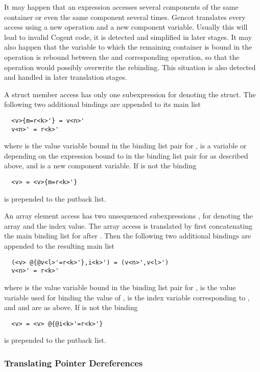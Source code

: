 It may happen that an expression accesses several components of the same container or even the same component several times.
Gencot translates every access using a new  operation and a new component variable. Usually this will lead to 
invalid Cogent code, it is detected and simplified in later stages. It may also happen that the variable to which the remaining 
container is bound in the  operation is rebound between the  and corresponding  operation,
so that the  operation would possibly overwrite the rebinding. This situation is also detected and handled in 
later translation stages.

A struct member access  has only one subexpression  for denoting the struct. The following two additional 
bindings are appended to its main list
\begin{verbatim}
  <v>{m=r<k>'} = v<n>'
  v<n>' = r<k>'
\end{verbatim}
where  is the value variable bound in the binding list pair for ,  is a variable or \code{\_} 
depending on the expression bound to  in the binding list pair for  as described above, and  
is a new component variable. If  is not \code{\_} the binding
\begin{verbatim}
  <v> = <v>{m=r<k>'}
\end{verbatim}
is prepended to the putback list.

An array element access  has two unsequenced subexpressions ,  for denoting the array and the index value.
The array access is translated by first concatenating the main binding list for  after . Then the following two additional 
bindings are appended to the resulting main list
\begin{verbatim}
  (<v> @{@v<l>'=r<k>'},i<k>') = (v<n>',v<l>')
  v<n>' = r<k>'
\end{verbatim}
where  is the value variable bound in the binding list pair for ,  is the value variable used for
binding the value of ,  is the index variable corresponding to , and  and  
are as above. If  is not \code{\_} the binding
\begin{verbatim}
  <v> = <v> @{@i<k>'=r<k>'}
\end{verbatim}
is prepended to the putback list.

\subsubsection{Translating Pointer Dereferences}

